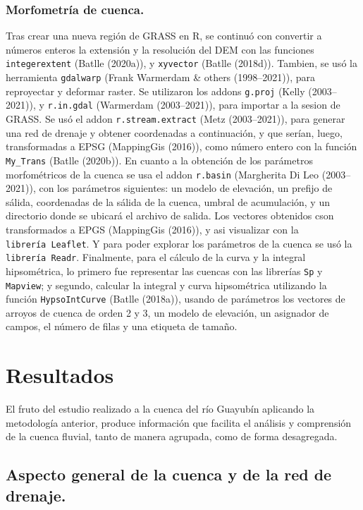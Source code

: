 \documentclass[11pt,]{article}
\begin{document}
\subsubsection{Morfometría de cuenca.}\label{morfometruxeda-de-cuenca.}

Tras crear una nueva región de GRASS en R, se continuó con convertir a
números enteros la extensión y la resolución del DEM con las funciones
\texttt{integerextent} (Batlle (2020a)), y \texttt{xyvector} (Batlle
(2018d)). Tambien, se usó la herramienta \texttt{gdalwarp} (Frank
Warmerdam \& others (1998--2021)), para reproyectar y deformar raster.
Se utilizaron los addons \texttt{g.proj} (Kelly (2003--2021)), y
\texttt{r.in.gdal} (Warmerdam (2003--2021)), para importar a la sesion
de GRASS. Se usó el addon \texttt{r.stream.extract} (Metz (2003--2021)),
para generar una red de drenaje y obtener coordenadas a continuación, y
que serían, luego, transformadas a EPSG (MappingGis (2016)), como número
entero con la función \texttt{My\_Trans} (Batlle (2020b)). En cuanto a
la obtención de los parámetros morfométricos de la cuenca se usa el
addon \texttt{r.basin} (Margherita Di Leo (2003--2021)), con los
parámetros siguientes: un modelo de elevación, un prefijo de sálida,
coordenadas de la sálida de la cuenca, umbral de acumulación, y un
directorio donde se ubicará el archivo de salida. Los vectores obtenidos
cson transformados a EPGS (MappingGis (2016)), y asi visualizar con la
\texttt{librería\ Leaflet}. Y para poder explorar los parámetros de la
cuenca se usó la \texttt{librería\ Readr}. Finalmente, para el cálculo
de la curva y la integral hipsométrica, lo primero fue representar las
cuencas con las librerías \texttt{Sp} y \texttt{Mapview}; y segundo,
calcular la integral y curva hipsométrica utilizando la función
\texttt{HypsoIntCurve} (Batlle (2018a)), usando de parámetros los
vectores de arroyos de cuenca de orden 2 y 3, un modelo de elevación, un
asignador de campos, el número de filas y una etiqueta de tamaño.

\section{Resultados}\label{resultados}

El fruto del estudio realizado a la cuenca del río Guayubín aplicando la
metodología anterior, produce información que facilita el análisis y
comprensión de la cuenca fluvial, tanto de manera agrupada, como de
forma desagregada.

\subsection{Aspecto general de la cuenca y de la red de
drenaje.}\label{aspecto-general-de-la-cuenca-y-de-la-red-de-drenaje.}
\end{document}

